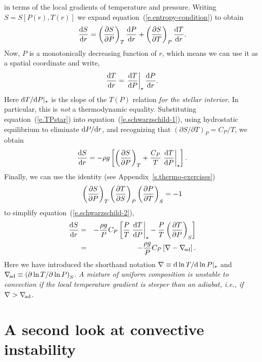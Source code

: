  in terms of the local gradients of temperature and pressure. Writing $S = S[P(r),T(r)]$ we expand equation~(\ref{e.entropy-condition}) to obtain
\begin{equation}\label{e.schwarzschild-1}
\frac{\mathrm{d} S}{\mathrm{d} r} = \left(\frac{\partial S}{\partial P}\right)_{T} \frac{\mathrm{d} P}{\mathrm{d} r} + \left(\frac{\partial S}{\partial T}\right)_{P}\frac{\mathrm{d} T}{\mathrm{d} r} .
\end{equation}
Now, $P$ is a monotonically decreasing function of $r$, which means we can use it as a spatial coordinate and write,
\begin{equation}\label{e.TPstar}
\frac{\mathrm{d} T}{\mathrm{d} r} = \left.\frac{\mathrm{d} T}{\mathrm{d} P}\right|_{\star} \frac{\mathrm{d} P}{\mathrm{d} r} .
\end{equation}
Here $\mathrm{d} T/\mathrm{d} P|_{\star}$ is the slope of the $T(P)$ relation \emph{for the stellar interior}.  In particular, this is \emph{not} a thermodynamic equality. Substituting equation~(\ref{e.TPstar}) into equation~(\ref{e.schwarzschild-1}), using hydrostatic equilibrium to eliminate $\mathrm{d} P/\mathrm{d} r$, and recognizing that $(\partial S/\partial T)_{P} = C_{P}/T$, we obtain
\begin{equation}\label{e.schwarzschild-2}
\frac{\mathrm{d} S}{\mathrm{d} r} =  -\rho g\left[\left(\frac{\partial S}{\partial P}\right)_{T} + \frac{C_{P}}{T} \left.\frac{\mathrm{d} T}{\mathrm{d} P}\right|_{\star} \right].
\end{equation}
Finally, we can use the identity (see Appendix~\ref{s.thermo-exercises})
\begin{equation}
\left(\frac{\partial S}{\partial P}\right)_{T}\left(\frac{\partial T}{\partial S}\right)_{P}\left(\frac{\partial P}{\partial T}\right)_{S} = -1
\end{equation}
to simplify equation~(\ref{e.schwarzschild-2}),
\begin{eqnarray}
\frac{\mathrm{d} S}{\mathrm{d} r} &=& -\frac{\rho g}{P}C_{P}\left[\frac{P}{T}\left.\frac{\mathrm{d} T}{\mathrm{d} P}\right|_{\star} - \frac{P}{T}\left(\frac{\partial T}{\partial P}\right)_{S}\right]\nonumber \\
 & = & -\frac{\rho g}{P}C_{P}\left[\nabla - \nabla_{\!\mathrm{ad}}\right].
 \label{e.schwarzschild}
\end{eqnarray}
Here we have introduced the shorthand notation $\nabla\equiv \mathrm{d} \ln T/\mathrm{d}\ln P|_{\star}$ and $\nabla_{\!\mathrm{ad}} \equiv \left(\partial \ln T/\partial\ln P\right)_{S}$.
\emph{A mixture of uniform composition is unstable to convection if the local temperature gradient is steeper than an adiabat, i.e., if $\nabla > \nabla_{\!\mathrm{ad}}$.}

\section{A second look at convective instability}\label{s.convection-second-look}

